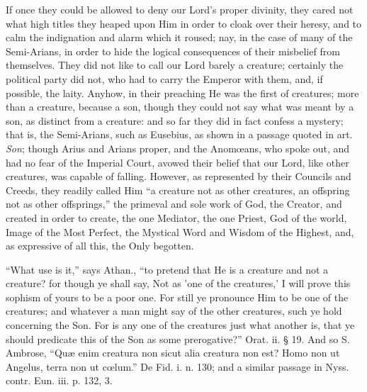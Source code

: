 If once they could be allowed to deny our Lord's
proper divinity, they cared not what high titles they heaped upon Him
in order to cloak over their heresy, and to calm the indignation and
alarm which it roused; nay, in the case of many of the Semi-Arians, in
order to hide the logical consequences of their misbelief from
themselves. They did not like to call our Lord barely a creature;
certainly the political party did not, who had to carry the Emperor
with them, and, if possible, the laity. Anyhow, in their preaching He
was the first of creatures; more than a creature, because a son,
though they could not say what was meant by a son, as distinct from a
creature: and so far they did in fact confess a mystery; that is, the
Semi-Arians, such as Eusebius, as shown in a passage quoted in art. \emph{Son};
though Arius and Arians proper, and the Anomœans, who spoke out, and
had no fear of the Imperial Court, avowed their belief that our
Lord, like other creatures, was capable of falling. However, as
represented by their Councils and Creeds, they readily called Him ``a
creature not as other creatures, an offspring not as other offsprings,''
the primeval and sole work of God, the Creator, and created in order
to create, the one Mediator, the one Priest, God of the world, Image
of the Most Perfect, the Mystical Word and Wisdom of the Highest, and,
as expressive of all this, the Only begotten.

``What use is it,'' says Athan., ``to pretend that
He is a creature and not a creature? for though ye shall say, Not as
'one of the creatures,' I will prove this sophism of yours to be a
poor one. For still ye pronounce Him to be one of the creatures; and
whatever a man might say of the other creatures, such ye hold
concerning the Son. For is any one of the creatures just what another
is, that ye should predicate this of the Son as some prerogative?''
Orat. ii. § 19. And so S. Ambrose, ``Quæ enim creatura non sicut alia
creatura non est? Homo non ut Angelus, terra non ut cœlum.'' De Fid. i.
n. 130; and a similar passage in Nyss. contr. Eun. iii. p. 132, 3.


